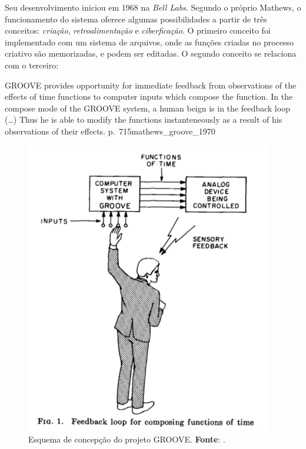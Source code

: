 Seu desenvolvimento iniciou em 1968 na \emph{Bell Labs}. Segundo o próprio Mathews, o funcionamento do sistema oferece algumas possibilidades a partir de três conceitos: \emph{criação}, \emph{retroalimentação} e \emph{ciberficação}. O primeiro conceito foi implementado com um sistema de arquivos, onde as funções criadas no processo criativo são memorizadas, e podem ser editadas. O segundo conceito se relaciona com o terceiro:

{
GROOVE provides opportunity for immediate feedback from observations of the effects of time functions to computer inputs which compose the function. In the compose mode of the GROOVE system, a human beign is in the feedback loop (\ldots) Thus he is able to modify the functions instanteneously as a result of his observations of their effects.
}
{p.~715}{mathews_groove_1970}

\begin{figure}
\begin{center}
\includegraphics[scale=0.618]{./imagens/GROOVE.png}
\caption{Esquema de concepção do projeto GROOVE. \textbf{Fonte}: \cite{mathews_groove_1970}.}
\label{fig:groove_sistema}
\end{center}
\end{figure} 

